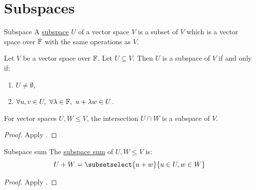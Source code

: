 \documentclass[../Main.tex]{subfiles}
\begin{document}
\section{Subspaces}
\begin{definition}{Subspace}
    A \underline{subspace} $U$ of a vector space $V$ is a subset of $V$ which is a vector space over $\mathbb{F}$ with the same operations as $V$.
\end{definition}
\begin{proposition}
    Let $V$ be a vector space over $\mathbb{F}$. Let $U \subseteq V$. Then $U$ is a subspace of $V$ if and only if:
    \begin{enumerate}
        \item $U \neq \emptyset$,
        \item $\forall u, v \in U,~\forall \lambda \in \mathbb{F},~u + \lambda w \in U$.
    \end{enumerate}
    \label{propSubspaceTest}
\end{proposition}
\begin{lemma}
    For vector spaces $U, W \leq V$, the intersection $U \cap W$ is a subspace of $V$.
    \label{lemIntersecIsSubspace}
\end{lemma}
\begin{proof}
    Apply .
\end{proof}
\begin{definition}{Subspace sum}
    The \underline{subspace sum} of $U, W \leq V$ is:
    \begin{equation*}
        U + W = \subsetselect{u + w}{u \in U, w \in W}
    \end{equation*}
\end{definition}
\begin{proof}
    Apply .
\end{proof}
\end{document}
